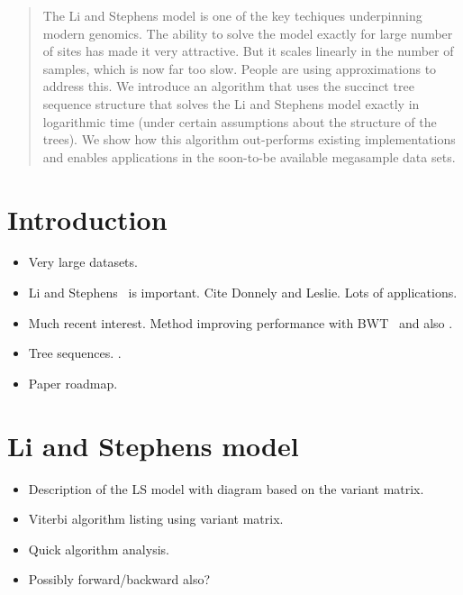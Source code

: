 \documentclass{article}
\begin{document}
\begin{abstract}
The Li and Stephens model is one of the key techiques underpinning modern
genomics. The ability to solve the model exactly for large number of
sites has made it very attractive. But it scales linearly in the number
of samples, which is now far too slow. People are using approximations
to address this. We introduce an algorithm that uses the succinct
tree sequence structure that solves the Li and Stephens model exactly
in logarithmic time (under certain assumptions about the structure
of the trees). We show how this algorithm out-performs existing implementations
and enables applications in the soon-to-be available megasample data sets.

\end{abstract}


\section{Introduction}

\begin{itemize}
\item Very large datasets.
\item Li and Stephens~\citep{li2003modeling} is important. Cite Donnely and
Leslie. Lots of applications.
\item Much recent interest. Method improving performance with BWT~\citep{lunter2018haplotype}
and also \citep{rosen2018average}.
\item Tree sequences.
\citep{kelleher2016efficient,kelleher2018efficient,kelleher2018inferring,haller2018tree}.
\item Paper roadmap.
\end{itemize}

\section{Li and Stephens model}

\begin{itemize}
\item Description of the LS model with diagram based on the variant matrix.
\item Viterbi algorithm listing using variant matrix.
\item Quick algorithm analysis.
\item Possibly forward/backward also?
\end{itemize}


\clearpage
\end{document}
